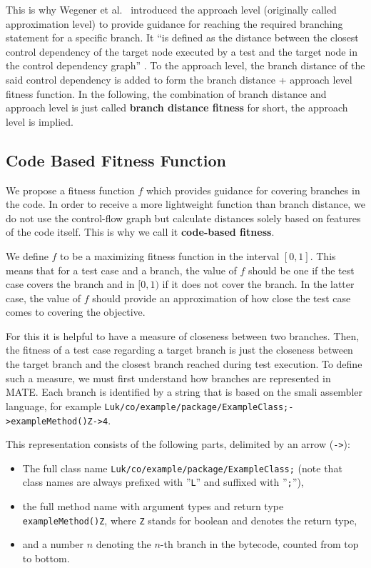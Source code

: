 \documentclass[
  a4paper,  %
  twoside,  %
  bibliography=totoc,
  headsepline,
  cleardoublepage=empty,
  parskip=half,
  draft=false
]{scrbook}
\begin{document}
This is why Wegener et al.~\cite{wegener2001evolutionary} introduced the approach level (originally called approximation level) to provide guidance for reaching the required branching statement for a specific branch.
It \enquote{is defined as the distance between the closest control dependency of the target node executed by a test and the target node in the control dependency graph} \cite{albunian2020causes}.
To the approach level, the branch distance of the said control dependency is added to form the branch distance + approach level fitness function. In the following, the combination of branch distance and approach level is just called \textbf{branch distance fitness} for short, the approach level is implied.

\subsection{Code Based Fitness Function}\label{code}

We propose a fitness function $f$ which provides guidance for covering branches in the code. In order to receive a more lightweight function than branch distance, we do not use the control-flow graph but calculate distances solely based on features of the code itself. This is why we call it \textbf{code-based fitness}.

We define $f$ to be a maximizing fitness function in the interval $[0, 1]$. This means that for a test case and a branch, the value of $f$ should be one if the test case covers the branch and in $[0, 1)$ if it does not cover the branch. In the latter case, the value of $f$ should provide an approximation of how close the test case comes to covering the objective.

For this it is helpful to have a measure of closeness between two branches. Then, the fitness of a test case regarding a  target branch is just the closeness between the target branch and the closest branch reached during test execution.
To define such a measure, we must first understand how branches are represented in MATE. Each branch is identified by a string that is based on the smali \cite{smali} assembler language, for example \texttt{Luk/co/example/package/ExampleClass;->exampleMethod()Z->4}.

This representation consists of the following parts, delimited by an arrow (\texttt{->}):
\begin{itemize}
	\item The full class name \texttt{Luk/co/example/package/ExampleClass;} (note that class names are always prefixed with ''\texttt{L}'' and suffixed with ''\texttt{;}''),
	\item the full method name with argument types and return type \texttt{exampleMethod()Z}, where \texttt{Z} stands for boolean and denotes the return type, 
	\item and a number $n$ denoting the $n$-th branch in the bytecode, counted from top to bottom.
\end{itemize}
\end{document}
